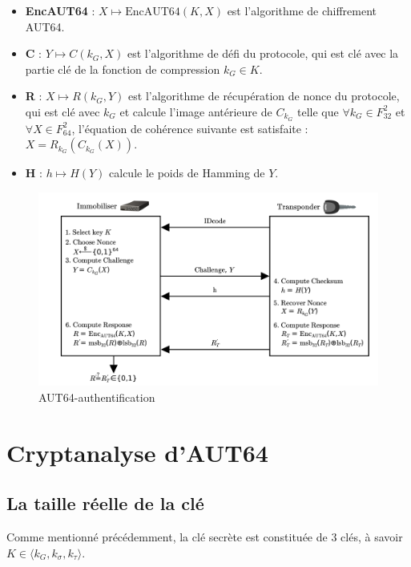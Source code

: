 \documentclass{template}
\begin{document}
\begin{itemize}
    \item \textbf{EncAUT64} : $X \mapsto \text{EncAUT64}(K, X)$ est l'algorithme de chiffrement AUT64.
    \item \textbf{C} : $Y \mapsto C(k_G, X)$ est l'algorithme de défi du protocole, qui est clé avec la partie clé de la fonction de compression $k_G \in K$.
    \item \textbf{R} : $X \mapsto R(k_G, Y)$ est l'algorithme de récupération de nonce du protocole, qui est clé avec $k_G$ et calcule l'image antérieure de $C_k_G$ telle que $\forall k_G \in F_{32}^2$ et $\forall X \in F_{64}^2$, l'équation de cohérence suivante est satisfaite : $X = R_{k_G}(C_{k_G}(X))$.
    \item \textbf{H} : $h \mapsto H(Y)$ calcule le poids de Hamming de $Y$.
\end{itemize}

 \begin{figure}
    \centering
    \includegraphics[width=\textwidth]{auth.PNG}
    \caption{AUT64-authentification}
    \label{fig:image}
\end{figure}


\chapter{Cryptanalyse d'AUT64}
\section{La taille réelle de la clé}
Comme mentionné précédemment, la clé secrète est constituée de 3 clés, à savoir $K \in \langle k_G, k_\sigma, k_\tau \rangle$.
\end{document}
